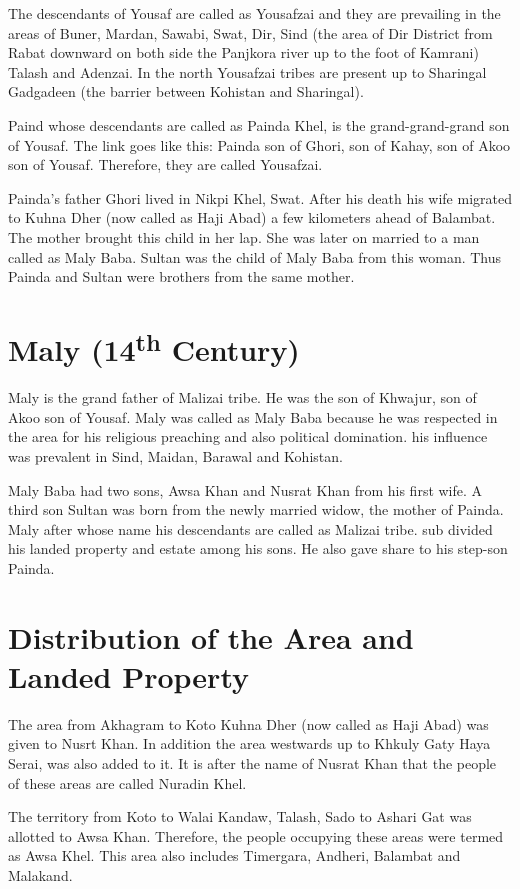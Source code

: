 \documentclass[twoside,openright]{book}
\begin{document}
The descendants of Yousaf are called as Yousafzai and they are prevailing in the
areas of Buner, Mardan, Sawabi, Swat, Dir, Sind (the area of Dir District from
Rabat downward on both side the Panjkora river up to the foot of Kamrani) Talash
and Adenzai. In the north Yousafzai tribes are present up to Sharingal Gadgadeen
(the barrier between Kohistan and Sharingal).

Paind whose descendants are called as Painda Khel, is the grand-grand-grand son
of Yousaf. The link goes like this: Painda son of Ghori, son of Kahay, son of
Akoo son of Yousaf. Therefore, they are called Yousafzai.

Painda's father Ghori lived in Nikpi Khel, Swat. After his death his wife
migrated to Kuhna Dher (now called as Haji Abad) a few kilometers ahead of
Balambat. The mother brought this child in her lap. She was later on married to
a man called as Maly Baba. Sultan was the child of Maly Baba from this woman.
Thus Painda and Sultan were brothers from the same mother.

\section{Maly (14\textsuperscript{th} Century)}

Maly is the grand father of Malizai tribe. He was the son of Khwajur, son of
Akoo son of Yousaf. Maly was called as Maly Baba because he was respected in the
area for his religious preaching and also political domination. his influence
was prevalent in Sind, Maidan, Barawal and Kohistan.

Maly Baba had two sons, Awsa Khan and Nusrat Khan from his first wife. A third
son Sultan was born from the newly married widow, the mother of Painda. Maly
after whose name his descendants are called as Malizai tribe. sub divided his
landed property and estate among his sons. He also gave share to his step-son
Painda.

\section{Distribution of the Area and Landed Property}

The area from Akhagram to Koto Kuhna Dher (now called as Haji Abad)
was given to Nusrt Khan. In addition the area westwards up
to Khkuly Gaty Haya Serai, was also added to it. It is after the
name of Nusrat Khan that the people of these areas are called Nuradin Khel.

The territory from Koto to Walai Kandaw, Talash, Sado to Ashari Gat was allotted
to Awsa Khan. Therefore, the people occupying these areas were termed as Awsa
Khel. This area also includes Timergara, Andheri, Balambat and Malakand.
\end{document}
